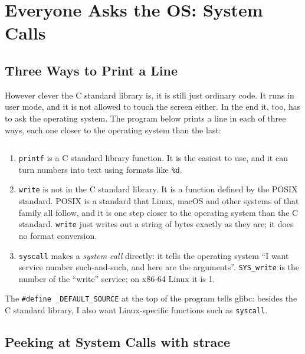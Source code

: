 \section{Everyone Asks the OS: System Calls}
\label{sec:syscall}

\subsection{Three Ways to Print a Line}

However clever the C standard library is, it is still just ordinary code. It runs in user mode, and it is not allowed to touch the screen either. In the end it, too, has to ask the operating system. The program below prints a line in each of three ways, each one closer to the operating system than the last:


\inputminted[linenos=false]{text}{code/en/ch05/out/layers.txt}

\begin{enumerate}
  \item \texttt{printf} is a C standard library function. It is the easiest to use, and it can turn numbers into text using formats like \texttt{\%d}.
  \item \texttt{write} is not in the C standard library. It is a function defined by the POSIX standard. POSIX is a standard that Linux, macOS and other systems of that family all follow, and it is one step closer to the operating system than the C standard. \texttt{write} just writes out a string of bytes exactly as they are; it does no format conversion.
  \item \texttt{syscall} makes a \emph{system call} directly: it tells the operating system ``I want service number such-and-such, and here are the arguments''. \texttt{SYS\_write} is the number of the ``write'' service; on x86-64 Linux it is 1.
\end{enumerate}

The \texttt{\#define \_DEFAULT\_SOURCE} at the top of the program tells glibc: besides the C standard library, I also want Linux-specific functions such as \texttt{syscall}.

\subsection{Peeking at System Calls with strace}

